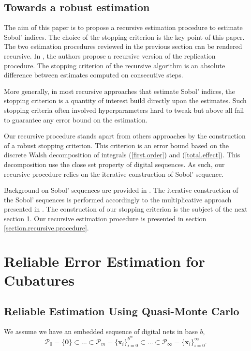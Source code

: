 \documentclass[]{elsarticle}
\theoremstyle{definition}
\newcommand{\bvec}[1]{\boldsymbol{#1}}
\newcommand{\vx}{\bvec{x}}
\begin{document}
\subsection{Towards a robust estimation}
The aim of this paper is to propose a recursive estimation procedure to estimate Sobol' indices. The choice of the stopping criterion is the key point of this paper. The two estimation procedures reviewed in the previous section can be rendered recursive. In \cite{Gilquin16}, the authors propose a recursive version of the replication procedure. The stopping criterion of the recursive algorithm is an absolute difference between estimates computed on consecutive steps. 

More generally, in most recursive approaches that estimate Sobol' indices, the stopping criterion is a quantity of interest build directly upon the estimates. Such stopping criteria often involved hyperparameters hard to tweak but above all fail to guarantee any error bound on the estimation. 
\bigskip

Our recursive procedure stands apart from others approaches by the construction of a robust stopping criterion. This criterion is an error bound based on the discrete Walsh decomposition of integrals (\ref{first.order}) and (\ref{total.effect}). This decomposition use the close set property of digital sequences. As such, our recursive procedure relies on the iterative construction of Sobol' sequence. 

Background on Sobol' sequences are provided in \cite{crass}. The iterative construction of the Sobol' sequences is performed accordingly to the multiplicative  approach presented in \cite{crass}. The construction of our stopping criterion is the subject of the next section \ref{section.error}. Our recursive estimation procedure is presented in section \ref{section.recursive.procedure}.


\section{Reliable Error Estimation for Cubatures}
\label{section.error} 

\subsection{Reliable Estimation Using Quasi-Monte Carlo}

We assume we have an embedded sequence of digital nets in base $b$,
\[
\mathcal{P}_0=\{\bvec{0}\}\subset\dots\subset\mathcal{P}_m=\{\vx_i\}_{i=0}^{b^m}\subset\dots\subset\mathcal{P}_\infty=\{\vx_i\}_{i=0}^{\infty}.
\]
\end{document}
